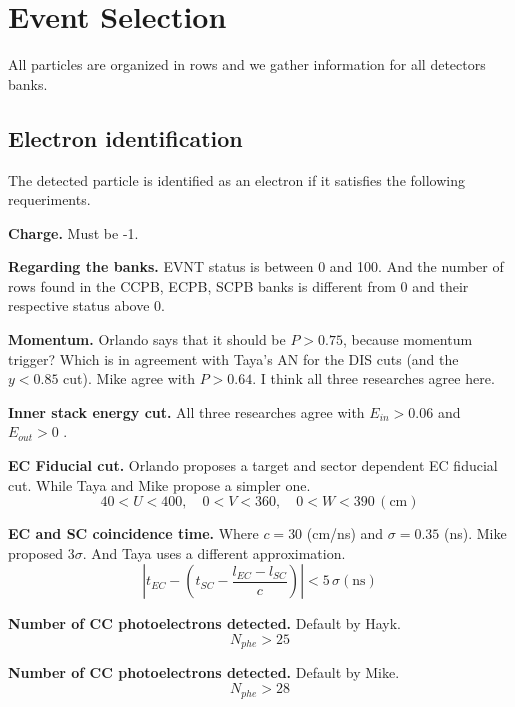 \chapter{Event Selection}

All particles are organized in rows and we gather information for all detectors banks.

\section{Electron identification}

The detected particle is identified as an electron if it satisfies the following requeriments.

\textbf{Charge.} Must be -1.

\textbf{Regarding the banks.} EVNT status is between 0 and 100. And the number of rows found in the CCPB, ECPB, SCPB banks is different from 0 and their respective status above 0.

\textbf{Momentum.} Orlando says that it should be $P > 0.75$, because momentum trigger? Which is in agreement with Taya's AN for the DIS cuts (and the $y < 0.85$ cut). Mike agree with $P > 0.64$. I think all three researches agree here.

\textbf{Inner stack energy cut.} All three researches agree with $E_{in} > 0.06$ and $E_{out} > 0$ .
	    
\textbf{EC Fiducial cut.} Orlando proposes a target and sector dependent EC fiducial cut. While Taya and Mike propose a simpler one.
\begin{equation}
    40 < U < 400, \quad 0 < V < 360, \quad 0 < W < 390 \, (\mbox{cm})
\end{equation}

\textbf{EC and SC coincidence time.} Where $c = 30$ (cm/ns) and $\sigma = 0.35$ (ns). Mike proposed $3\sigma$. And Taya uses a different approximation.
\begin{equation}
    \left| t_{EC} - \left( t_{SC} - \frac{l_{EC} - l_{SC}}{c} \right) \right| < 5 \, \sigma (\mbox{ns})   
\end{equation}

\textbf{Number of CC photoelectrons detected.} Default by Hayk.
\begin{equation}
    N_{phe} > 25
\end{equation}

\textbf{Number of CC photoelectrons detected.} Default by Mike.
\begin{equation}
    N_{phe} > 28
\end{equation}

